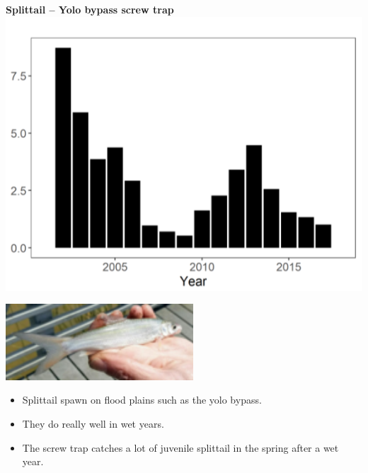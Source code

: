 \documentclass[]{article}\usepackage[]{graphicx}\usepackage[]{color}
\begin{document}
\begin{Row}
  \begin{Cell}{7}
    \begin{center}
      {\bf {\large Splittail – Yolo bypass screw trap}}
      \includegraphics[align=m]{figures/otherfish/splittail_yb_tmp.png}
    \end{center}
  \end{Cell}
  \begin{Cell}{6}
    \begin{center}
      \vspace{1cm}
      \includegraphics[width=7cm,align=m]{figures/otherfish/splittail_photo.png}
      \vspace{1.5cm}
      \begin{itemize}[leftmargin=*]
        \item Splittail spawn on flood plains such as the yolo bypass.
        \item They do really well in wet years. 
        \item The screw trap catches a lot of juvenile splittail in the spring after 
        a wet year.
      \end{itemize}
    \end{center}
  \end{Cell}
\end{Row}
\end{document}
